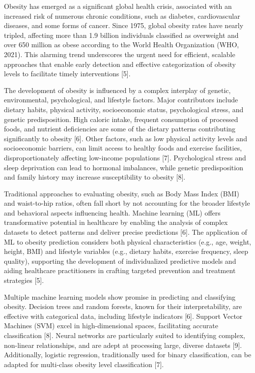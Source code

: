 Obesity has emerged as a significant global health crisis, associated
with an increased risk of numerous chronic conditions, such as diabetes,
cardiovascular diseases, and some forms of cancer. Since 1975, global
obesity rates have nearly tripled, affecting more than 1.9 billion
individuals classified as overweight and over 650 million as obese
according to the World Health Organization (WHO, 2021). This alarming
trend underscores the urgent need for efficient, scalable approaches
that enable early detection and effective categorization of obesity
levels to facilitate timely interventions {[}5{]}.

The development of obesity is influenced by a complex interplay of
genetic, environmental, psychological, and lifestyle factors. Major
contributors include dietary habits, physical activity, socioeconomic
status, psychological stress, and genetic predisposition. High caloric
intake, frequent consumption of processed foods, and nutrient
deficiencies are some of the dietary patterns contributing significantly
to obesity {[}6{]}. Other factors, such as low physical activity levels
and socioeconomic barriers, can limit access to healthy foods and
exercise facilities, disproportionately affecting low-income populations
{[}7{]}. Psychological stress and sleep deprivation can lead to hormonal
imbalances, while genetic predisposition and family history may increase
susceptibility to obesity {[}8{]}.

Traditional approaches to evaluating obesity, such as Body Mass Index
(BMI) and waist-to-hip ratios, often fall short by not accounting for
the broader lifestyle and behavioral aspects influencing health. Machine
learning (ML) offers transformative potential in healthcare by enabling
the analysis of complex datasets to detect patterns and deliver precise
predictions {[}6{]}. The application of ML to obesity prediction
considers both physical characteristics (e.g., age, weight, height, BMI)
and lifestyle variables (e.g., dietary habits, exercise frequency, sleep
quality), supporting the development of individualized predictive models
and aiding healthcare practitioners in crafting targeted prevention and
treatment strategies {[}5{]}.

Multiple machine learning models show promise in predicting and
classifying obesity. Decision trees and random forests, known for their
interpretability, are effective with categorical data, including
lifestyle indicators {[}6{]}. Support Vector Machines (SVM) excel in
high-dimensional spaces, facilitating accurate classification {[}8{]}.
Neural networks are particularly suited to identifying complex,
non-linear relationships, and are adept at processing large, diverse
datasets {[}9{]}. Additionally, logistic regression, traditionally used
for binary classification, can be adapted for multi-class obesity level
classification {[}7{]}.


